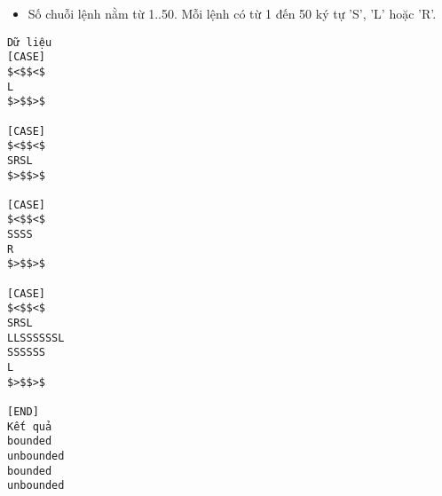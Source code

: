\begin{itemize}
	\item     Số chuỗi lệnh nằm từ 1..50. Mỗi lệnh có từ 1 đến 50 ký tự 'S', 'L' hoặc 'R'.   
\end{itemize}
\begin{verbatim}
Dữ liệu
[CASE]
$<$$<$
L
$>$$>$

[CASE]
$<$$<$
SRSL
$>$$>$

[CASE]
$<$$<$
SSSS
R
$>$$>$

[CASE]
$<$$<$
SRSL
LLSSSSSSL
SSSSSS
L
$>$$>$

[END]
Kết quả
bounded
unbounded
bounded
unbounded
\end{verbatim}